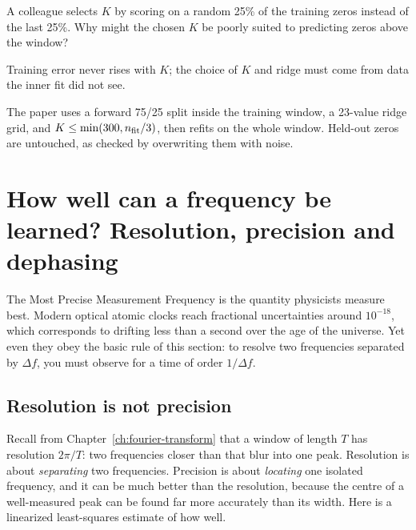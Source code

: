 \begin{checkpoint}
A colleague selects $K$ by scoring on a random 25\% of the training zeros instead of the last 25\%. Why might the chosen $K$ be poorly suited to predicting zeros above the window?
\end{checkpoint}

\begin{keyideas}
\item Training error never rises with $K$; the choice of $K$ and ridge must come from data the inner fit did not see.
\item The paper uses a forward 75/25 split inside the training window, a 23-value ridge grid, and $K\le\min(300,n_{\rm fit}/3)$, then refits on the whole window. Held-out zeros are untouched, as checked by overwriting them with noise.
\end{keyideas}

\section{How well can a frequency be learned? Resolution, precision and dephasing}\label{sec:sparse-frequency-precision}
\begin{didyouknow}{The Most Precise Measurement}
Frequency is the quantity physicists measure best. Modern optical atomic clocks reach fractional uncertainties around $10^{-18}$, which corresponds to drifting less than a second over the age of the universe. Yet even they obey the basic rule of this section: to resolve two frequencies separated by $\Delta f$, you must observe for a time of order $1/\Delta f$.
\end{didyouknow}

\subsection{Resolution is not precision}

Recall from Chapter~\ref{ch:fourier-transform} that a window of length $T$ has resolution $2\pi/T$: two frequencies closer than that blur into one peak. Resolution is about \emph{separating} two frequencies. Precision is about \emph{locating} one isolated frequency, and it can be much better than the resolution, because the centre of a well-measured peak can be found far more accurately than its width. Here is a linearized least-squares estimate of how well.

